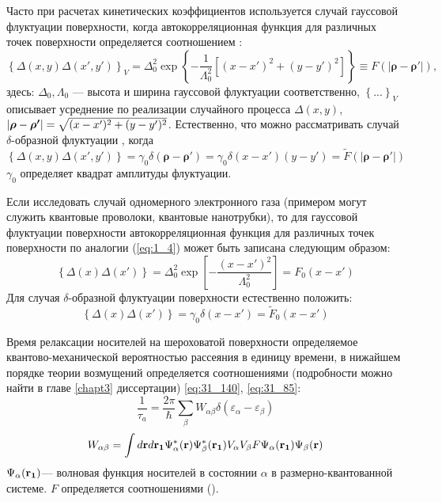 Часто при расчетах кинетических коэффициентов используется случай гауссовой флуктуации поверхности, когда автокорреляционная функция для различных точек поверхности определяется соотношением \cite{Sakaki1987,Shchurova2009,Pozdnyakov2006,Khanh2016,Gold1987,Thongnum2008,Su2013}:
\begin{equation}
\label{eq:1_4}
\left\{ \Delta(x,y)\Delta(x',y') \right\}_V = \Delta_0^2 \exp \left\lbrace - \frac{1}{\Lambda_0^2} \left[ (x-x')^2 +(y-y')^2 \right] \right\rbrace \equiv F \left( \left| \boldsymbol{\rho} - \boldsymbol{\rho'} \right| \right),
\end{equation}
здесь:
$\Delta_0, \Lambda_0$ --- высота и ширина гауссовой флуктуации соответственно, 
$\left\{ ... \right\}_V$
описывает усреднение по реализации случайного процесса 
$\Delta(x,y)$, $\left| \boldsymbol{\mathbf{\rho}} - \boldsymbol{\mathbf{\rho'}} \right| = \sqrt{(x-x')^2 + (y-y')^2}$.
Естественно, что можно рассматривать случай $\delta$-образной флуктуации \cite{Lozovik1998}, когда
\begin{equation}
\label{eq:1_5}
\left\{ \Delta(x,y)\Delta(x',y') \right\} = \gamma_0\delta\left( \boldsymbol{\rho} - \boldsymbol{\rho'} \right) = \gamma_0\delta(x-x')(y-y')=\tilde{F} \left(\left| \boldsymbol{\rho} - \boldsymbol{\rho'} \right|\right)
\end{equation}
$\gamma_0$ определяет квадрат амплитуды флуктуации.

Если исследовать случай одномерного электронного газа (примером могут служить квантовые проволоки, квантовые нанотрубки), то для гауссовой флуктуации поверхности автокорреляционная функция для различных точек поверхности по аналогии (\ref{eq:1_4}) может быть записана следующим образом:
\begin{equation}
\label{eq:1_6}
\left\{\Delta(x)\Delta(x')\right\}=\Delta^2_0 \exp \left[-\frac{(x-x')^2}{\Lambda^2_0}\right] = F_0(x-x')
\end{equation}
Для случая $\delta$-образной флуктуации поверхности естественно положить:
\begin{equation}
\label{eq:1_7}
\left\{\Delta(x)\Delta(x')\right\}= \gamma_0 \delta(x-x') = \tilde{F}_0(x-x')
\end{equation}

Время релаксации носителей на шероховатой поверхности определяемое квантово-механической вероятностью рассеяния в единицу времени, в нижайшем порядке теории возмущений определяется соотношениями (подробности можно найти в главе \ref{chapt3} диссертации) \eqref{eq:31_140}, \eqref{eq:31_85}:
\begin{equation} \label{eq:1_8}
\frac{1}{\tau_a}=\frac{2\pi}{\hbar} \sum_\beta{W_{\alpha\beta}\delta\left(\varepsilon_\alpha-\varepsilon_\beta\right)}
\end{equation}
\begin{equation} \label{eq:1_8_5}
W_{\alpha\beta}=\int{d\boldsymbol{\mathbf{r}} d\boldsymbol{\mathbf{r_1}} \Psi^*_\alpha(\boldsymbol{\mathbf{r}}) \Psi^*_\beta(\boldsymbol{\mathbf{r_1}}) V_\alpha V_\beta F \Psi_\alpha(\boldsymbol{\mathbf{r_1}}) \Psi_\beta(\boldsymbol{\mathbf{r}})}
\end{equation}
$\Psi_\alpha(\boldsymbol{\mathbf{r_1}})$--- волновая функция носителей в состоянии $\alpha$ в размерно-квантованной системе. $F$ определяется соотношениями ().

